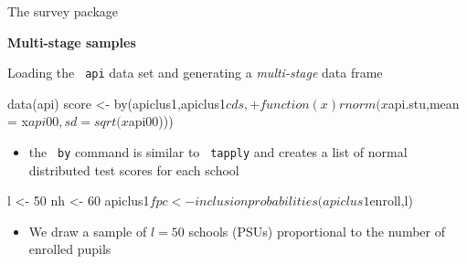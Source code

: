 \documentclass[11pt,german,hideothersubsections]{beamer}
\newcommand{\R}[1]{{\tt \color{blue}  #1}}
\begin{document}
\begin{frame}[fragile]{The survey package}
\vspace{-.25cm}
\begin{center}
\textbf{Multi-stage samples}
\end{center}
\footnotesize{
Loading the \R{api} data set and generating a \emph{multi-stage} data frame

\begin{Schunk}
\begin{Sinput}
 data(api)
 score <- by(apiclus1,apiclus1$cds,
+         function(x)rnorm(x$api.stu,mean = x$api00, sd = sqrt(x$api00)))
\end{Sinput}
\end{Schunk}

\begin{itemize}
\item the \R{by} command is similar to \R{tapply} and creates a list of normal distributed test scores for each school 
\end{itemize}

\begin{Schunk}
\begin{Sinput}
 l <- 50
 nh <- 60
 apiclus1$fpc <- inclusionprobabilities(apiclus1$enroll,l)
\end{Sinput}
\end{Schunk}

\begin{itemize}
\item We draw a sample of $l=50$ schools (PSUs) proportional to the number of enrolled pupils
\end{itemize}

}
\end{frame}
\end{document}
